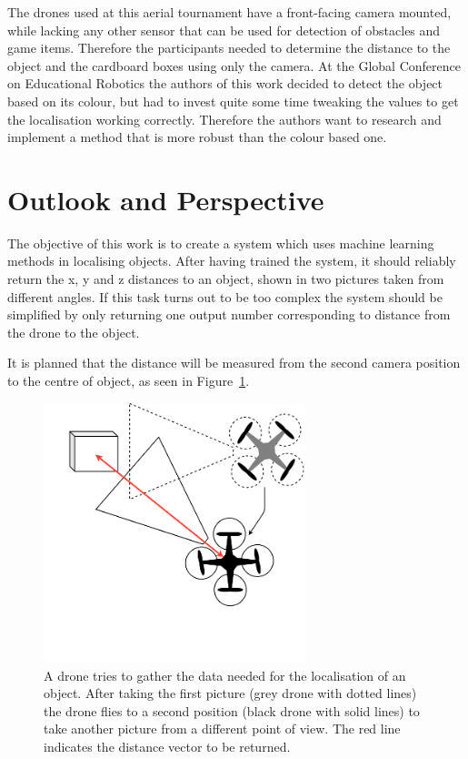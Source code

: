 The drones used at this aerial tournament have a front-facing camera mounted, while lacking any other sensor that can be used for detection of obstacles and game items. Therefore the participants needed to determine the distance to the object and the cardboard boxes using only the camera. At the Global Conference on Educational Robotics the authors of this work decided to detect the object based on its colour, but had to invest quite some time tweaking the values to get the localisation working correctly. Therefore the authors want to research and implement a method that is more robust than the colour based one.

\section{Outlook and Perspective}
The objective of this work is to create a system which uses machine learning methods in localising objects. After having trained the system, it should reliably return the x, y and z distances to an object, shown in two pictures taken from different angles. If this task turns out to be too complex the system should be simplified by only returning one output number corresponding to distance from the drone to the object.

It is planned that the distance will be measured from the second camera position to the centre of object, as seen in Figure~\ref{pic:introduction_outlookPerspective_pointsOfView}.

\begin{figure}[h]
	\centering
	\includegraphics[width=3in]{img/introduction_outlookPerspective_pointsOfView.png}
	\caption{A drone tries to gather the data needed for the localisation of an object. After taking the first picture (grey drone with dotted lines) the drone flies to a second position (black drone with solid lines) to take another picture from a different point of view. The red line indicates the distance vector to be returned.}
	\label{pic:introduction_outlookPerspective_pointsOfView}
\end{figure}

